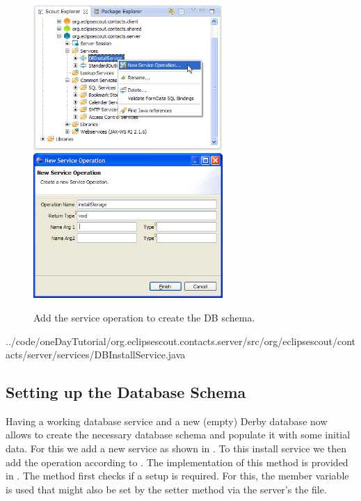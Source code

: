 \documentclass[a4paper,10pt,twoside]{book}
\begin{document}
\begin{figure}
\includegraphics[height=5.5cm]{new_operation_installstorage_contextmenu.png} \hspace{5mm}
\includegraphics[height=5.5cm]{new_operation_installstorage.png} 
\caption{Add the service operation to create the DB schema. }
\end{figure}



{../code/oneDayTutorial/org.eclipsescout.contacts.server/src/org/eclipsescout/contacts/server/services/DBInstallService.java}

\subsection{Setting up the Database Schema}

Having a working database service and a new (empty) Derby database now allows to create the necessary database schema and populate it with some initial data.
For this we add a new  service as shown in .
To this install service we then add the  operation according to .
The implementation of this method is provided in .
The method first checks if a setup is required. 
For this, the member variable  is used that might also be set by the  setter method via the server's the  file.
\end{document}
